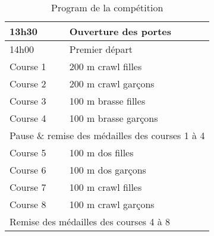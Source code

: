 \documentclass{article}
\begin{document}
\begin{table}[here!]
\centering
\begin{tabular}{|l|l|}
\hline
13h30 & Ouverture des portes\\
\hline
14h00 & Premier départ\\
\hline
Course 1 & 200 m crawl filles\\
\hline
Course 2 & 200 m crawl garçons\\
\hline
Course 3 & 100 m brasse filles\\
\hline
Course 4 & 100 m brasse garçons\\
\hline
\multicolumn{2}{|l|}{Pause \& remise des médailles des courses 1 à 4}\\
\hline
Course 5 & 100 m dos filles\\
\hline
Course 6 & 100 m dos garçons\\
\hline
Course 7 & 100 m crawl filles\\
\hline
Course 8 & 100 m crawl garçons\\
\hline
\multicolumn{2}{|l|}{Remise des médailles des courses 4 à 8}\\
\hline
\end{tabular}
\caption{Program de la compétition}
\end{table}
\end{document}
